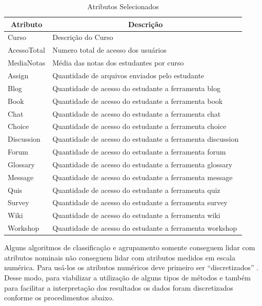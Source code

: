 \documentclass[12pt]{article}
\begin{document}
\begin{table}[!htpb]
 \centering
	\caption{Atributos Selecionados}
\begin{tabular}{|l|l|}
\hline
\multicolumn{1}{|c|}{Atributo} & \multicolumn{1}{c|}{Descrição} \\ \hline
Curso & Descrição do Curso \\ \hline
AcessoTotal & Numero total de acesso dos usuários \\ \hline
MediaNotas & Média das notas dos estudantes por curso \\ \hline
Assign & Quantidade de arquivos enviados pelo estudante  \\ \hline
Blog & Quantidade de acesso do estudante a ferramenta blog \\ \hline
Book & Quantidade de acesso do estudante a ferramenta book \\ \hline
Chat & Quantidade de acesso do estudante a ferramenta chat \\ \hline
Choice & Quantidade de acesso do estudante a ferramenta choice \\ \hline
Discussion & Quantidade de acesso do estudante a ferramenta discussion \\ \hline
Forum & Quantidade de acesso do estudante a ferramenta forum \\ \hline
Glossary & Quantidade de acesso do estudante a ferramenta glossary \\ \hline
Message & Quantidade de acesso do estudante a ferramenta message \\ \hline
Quis & Quantidade de acesso do estudante a ferramenta quiz \\ \hline
Survey & Quantidade de acesso do estudante a ferramenta survey \\ \hline
Wiki & Quantidade de acesso do estudante a ferramenta wiki \\ \hline
Workshop & Quantidade de acesso do estudante a ferramenta workshop \\ \hline
\end{tabular}
\label{t_fixas}
\end{table}
Alguns algoritmos de classificação e agrupamento somente conseguem lidar com atributos nominais não conseguem lidar com atributos medidos em escala numérica. Para usá-los os atributos numéricos deve primeiro ser ``discretizados'' \cite{Witten:2011:DMP:1972514}. Desse modo, para viabilizar a utilização de alguns tipos de métodos e também para facilitar a interpretação dos resultados os dados foram discretizados conforme os procedimentos abaixo.
\end{document}
